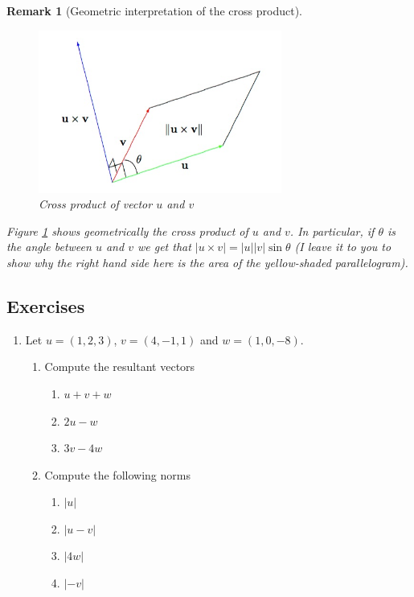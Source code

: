 \documentclass[12pt]{article}
\numberwithin{equation}{subsection}
\numberwithin{figure}{subsection}
\theoremstyle{note}
\newtheorem{remark}[subsection]{Remark}
\begin{document}
{\begin{remark}[Geometric interpretation of the cross product]
\begin{figure}[h!]
 \centering 
  \includegraphics[width=80mm]{Images/cross-prod1} 
   \caption{Cross product of vector $u$ and $v$}
  \label{fig-cp} \end{figure}

Figure \ref{fig-cp} shows geometrically the cross product of $u$ and $v$. In particular, if $\theta$ is the angle between $u$ and $v$ we get that $|u\times v|= |u| |v|\sin \theta$ (I leave it to you to show why the right hand side here is the area of the yellow-shaded parallelogram).\end{remark}



\subsection{Exercises}
\begin{enumerate}[label=\arabic*.]
\item Let $u=(1,2,3)$, $v=(4,-1,1)$ and $w=(1,0,-8)$. 

\begin{enumerate}
	\item Compute the resultant vectors
	\begin{enumerate}[label=(\roman*)]
		\item $u+v+w$
		\item $2u-w$
		\item $3v-4w$
	\end{enumerate}
	
	\item Compute the following norms 
	\begin{enumerate}[label=(\roman*)]
		\item $|u|$
		\item $|u-v|$
		\item $|4w|$
		\item $|-v|$
	\end{enumerate}
\end{enumerate}





\end{enumerate}}
\end{document}
